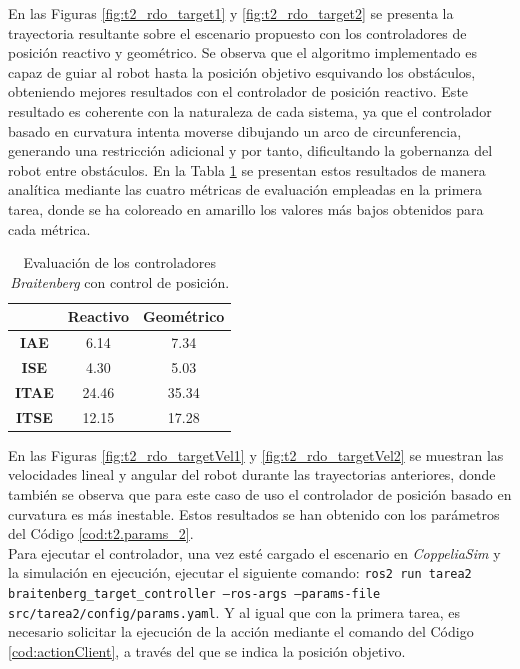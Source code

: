 En las Figuras \ref{fig:t2_rdo_target1} y \ref{fig:t2_rdo_target2} se presenta 
la trayectoria resultante sobre el escenario propuesto
con los controladores de posición reactivo y geométrico.
Se observa que el algoritmo implementado es capaz de guiar al robot hasta 
la posición objetivo esquivando los obstáculos, obteniendo mejores resultados 
con el controlador de posición reactivo. Este resultado es coherente con la 
naturaleza de cada sistema, ya que el controlador basado en curvatura 
intenta moverse dibujando un arco de circunferencia, generando una restricción adicional
y por tanto, dificultando la gobernanza del robot entre obstáculos. En la Tabla
\ref{tab:controladores_brai_desempeno} se presentan estos resultados de manera 
analítica mediante las cuatro métricas de evaluación empleadas en la primera tarea, 
donde se ha coloreado en amarillo los valores más bajos obtenidos para cada métrica.

\begin{table}[H]
  \centering
\begin{tabular}{|c|c|c|}
\hline
\multicolumn{1}{|l|}{\textbf{}} & \textbf{Reactivo}            & \textbf{Geométrico} \\ \hline
\textbf{IAE}                    & \cellcolor[HTML]{FFFE65}6.14 & 7.34               \\ \hline
\textbf{ISE}                    & \cellcolor[HTML]{FFFE65}4.30 & 5.03                \\ \hline
\textbf{ITAE}                   & \cellcolor[HTML]{FFFE65}24.46 & 35.34                \\ \hline
\textbf{ITSE}                   & \cellcolor[HTML]{FFFE65}12.15 & 17.28                \\ \hline
\end{tabular}
\caption{Evaluación de los controladores \textit{Braitenberg} con control de posición.}
\label{tab:controladores_brai_desempeno}
\end{table}

En las Figuras \ref{fig:t2_rdo_targetVel1} y \ref{fig:t2_rdo_targetVel2} se muestran 
las velocidades lineal y angular del robot
durante las trayectorias anteriores, donde también se observa que para este caso de uso 
el controlador de posición basado en curvatura es más inestable. Estos resultados se han 
obtenido con los parámetros del Código \ref{cod:t2.params_2}. \\

Para ejecutar el controlador, una vez esté cargado el escenario en \textit{CoppeliaSim}
y la simulación en ejecución, ejecutar el siguiente comando:
\texttt{ros2 run tarea2 braitenberg\_target\_controller --ros-args --params-file src/tarea2/config/params.yaml}. 
Y al igual que con la primera tarea, es necesario solicitar la ejecución de la acción
mediante el comando del Código \ref{cod:actionClient}, a través del que se indica 
la posición objetivo.


